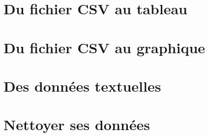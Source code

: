 \documentclass[12pt]{article}
\begin{document}
\section{Du fichier CSV au tableau}





\section{Du fichier CSV au graphique}




\section{Des données textuelles}





\section{Nettoyer ses données}
\end{document}
